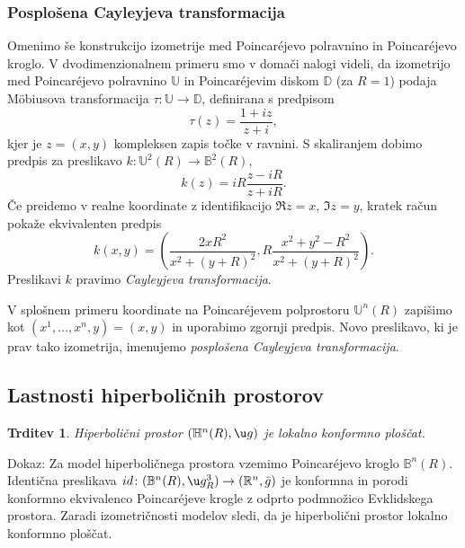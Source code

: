 \documentclass[a4paper]{article}
\newtheorem{trditev}{Trditev}
\begin{document}
\subsubsection{Posplošena Cayleyjeva transformacija}
Omenimo še konstrukcijo izometrije med Poincar\'ejevo polravnino in Poincar\'ejevo kroglo. 
V dvodimenzionalnem primeru smo v domači nalogi videli, da izometrijo med Poincar\'ejevo polravnino $\mathbb{U}$ in Poincar\'ejevim diskom $\mathbb{D}$ (za $R=1$) podaja M\"obiusova transformacija $\tau \colon \mathbb{U} \to \mathbb{D}$, definirana s predpisom
\begin{equation}
\tau(z) = \frac{1+iz}{z+i},
\end{equation} 
kjer je $z=(x,y)$ kompleksen zapis točke v ravnini. S skaliranjem dobimo predpis za preslikavo $k \colon \mathbb{U}^{2}(R) \to \mathbb{B}^{2}(R)$,
\begin{equation}
k(z) = iR \frac{z-iR}{z+iR}.
\end{equation} 
Če preidemo v realne koordinate z identifikacijo $\Re{z}=x$, $\Im{z}=y$, kratek račun pokaže ekvivalenten predpis
\begin{equation}
k(x,y) = \left( \frac{2xR^2}{x^2+(y+R)^2}, R \frac{x^2+y^2-R^2}{x^2+(y+R)^2} \right).
\end{equation}
Preslikavi $k$ pravimo \emph{Cayleyjeva transformacija}.

V splošnem primeru koordinate na Poincar\'ejevem polprostoru $\mathbb{U}^{n}(R)$ zapišimo kot $(x^{1}, \dots , x^{n}, y) = (x,y)$ in uporabimo zgornji predpis. Novo preslikavo, ki je prav tako izometrija, imenujemo \emph{posplošena Cayleyjeva transformacija}.

\subsection{Lastnosti hiperboličnih prostorov}

\begin{trditev}
Hiperbolični prostor $(\mathbb{H}^{n}(R), \u g)$ je lokalno konformno ploščat.
\end{trditev}

Dokaz:
Za model hiperboličnega prostora vzemimo Poincar\'ejevo kroglo  $\mathbb{B}^{n}(R)$. Identična preslikava $id \colon (\mathbb{B}^{n}(R), \u g_{R}^{3}) \to (\mathbb{R}^{n}, \bar{g})$ je konformna in porodi konformno ekvivalenco Poincar\'ejeve krogle z odprto podmnožico Evklidskega prostora. Zaradi izometričnosti modelov sledi, da je hiperbolični prostor lokalno konformno ploščat.
\end{document}
